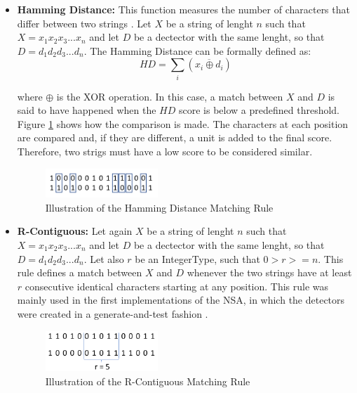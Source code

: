 \begin{itemize}
    \item \textbf{Hamming Distance:} This function measures the number of characters that differ between two strings \cite{ICBook2009}.  Let \(X\) be a string of lenght \(n\) such that \(X = x_1 x_2 x_3...x_n\) and let \(D\) be a dectector with the same lenght, so that \(D = d_1 d_2 d_3...d_n\). The Hamming Distance can be formally defined as:
    \[HD = \sum_i(\overline{x_i \oplus d_i})\]
	 
	where \( \oplus \) is the XOR operation. In this case, a match between \(X\) and \(D\) is said to have happened when the \(HD\) score is below a predefined threshold. Figure \ref{fig:hamm} shows how the comparison is made. The characters at each position are compared and, if they are different, a unit is added to the final score. Therefore, two strigs must have a low score to be considered similar.

	\begin{figure}[!h]
		\centering
		\includegraphics[width=0.4\textwidth, keepaspectratio]{img/hamming.png}
		\caption{Illustration of the Hamming Distance Matching Rule}
		\label{fig:hamm}
	\end{figure}
    
    \item \textbf{R-Contiguous:} Let again \(X\) be a string of lenght \(n\) such that \(X = x_1 x_2 x_3...x_n\) and let \(D\) be a dectector with the same lenght, so that \(D = d_1 d_2 d_3...d_n\). Let also \(r\) be an IntegerType, such that \(0 > r >= n\). This rule defines a match between \(X\) and \(D\) whenever the two strings have at least \(r\) consecutive identical characters starting at any position. This rule was mainly used in the first implementations of the NSA, in which the detectors were created in a generate-and-test fashion \cite{EffectBinaryRule2003}.
    
	\begin{figure}[!h]
		\centering
		\includegraphics[width=0.4\textwidth, keepaspectratio]{img/rcontiguous.png}
		\caption{Illustration of the R-Contiguous Matching Rule}
		\label{fig:rcont}
	\end{figure}


\end{itemize}
